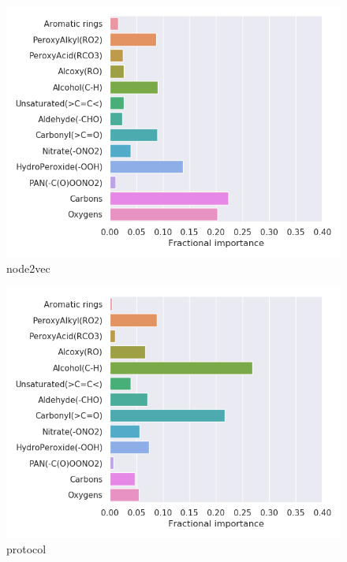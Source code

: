 \begin{subfigure}[b]{0.46\textwidth}
    \centering
    \includegraphics[width=\textwidth]{outputs/t-SNE/node2vec/legend.png}
    \caption{node2vec}
    \label{fig:legend_t-SNE_node2vec}
\end{subfigure}
\begin{subfigure}[b]{0.46\textwidth}
    \centering
    \includegraphics[width=\textwidth]{outputs/t-SNE/protocol/legend.png}
    \caption{protocol}
    \label{fig:legend_t-SNE_protocol}
\end{subfigure}\\
